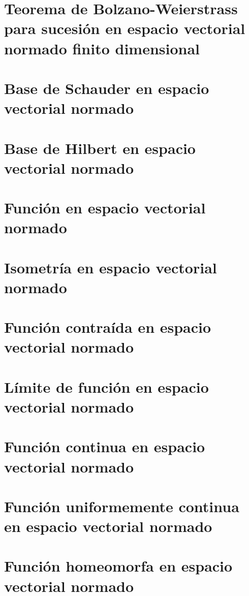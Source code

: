 \section{Teorema de Bolzano-Weierstrass para sucesión en espacio vectorial normado finito dimensional}

\section{Base de Schauder en espacio vectorial normado}

\section{Base de Hilbert en espacio vectorial normado}

\section{Función en espacio vectorial normado}

\section{Isometría en espacio vectorial normado}

\section{Función contraída en espacio vectorial normado}

\section{Límite de función en espacio vectorial normado}

\section{Función continua en espacio vectorial normado}

\section{Función uniformemente continua en espacio vectorial normado}

\section{Función homeomorfa en espacio vectorial normado}


